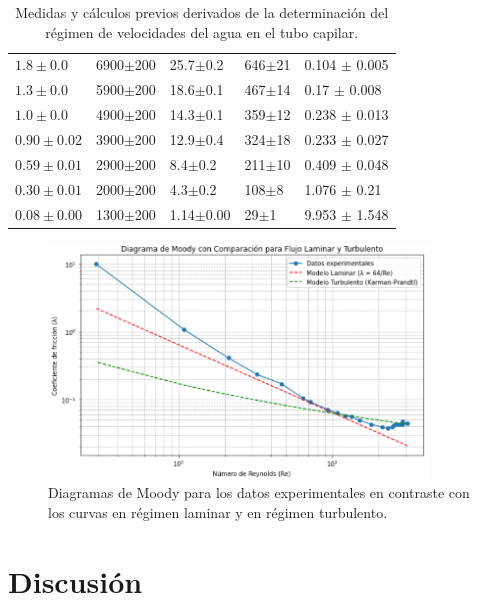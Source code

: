 \begin{table}[H]
\begin{minipage}{\textwidth}
\begin{tabular}{|C{1.8cm}|C{2cm}|C{2.5cm}|w{c}{2.5cm}|C{2.5cm}|}
				$1.8 \pm 0.0$  &  6900$\pm$200 &   25.7$\pm$0.2 &  646$\pm$21 &0.104 $\pm$ 0.005 \\
				$1.3 \pm 0.0$  &  5900$\pm$200 &   18.6$\pm$0.1 &  467$\pm$14 &0.17 $\pm$ 0.008 \\
				$1.0 \pm 0.0$  &  4900$\pm$200 &   14.3$\pm$0.1 &  359$\pm$12 &0.238 $\pm$ 0.013 \\
				$0.90\pm 0.02$ &  3900$\pm$200 &   12.9$\pm$0.4 &  324$\pm$18 &0.233 $\pm$ 0.027 \\
				$0.59\pm 0.01$ &  2900$\pm$200 &    8.4$\pm$0.2 &  211$\pm$10 &0.409 $\pm$ 0.048 \\
				$0.30\pm 0.01$ &  2000$\pm$200 &    4.3$\pm$0.2 &  108$\pm$8  &1.076 $\pm$ 0.21 \\
				$0.08\pm 0.00$ &  1300$\pm$200 &   1.14$\pm$0.00&   29$\pm$1  &9.953 $\pm$ 1.548 \\
				\bottomrule
				\bottomrule		
			\end{tabular}
			\caption{ \footnotesize Medidas y cálculos previos derivados de la determinación del régimen de velocidades del agua en el tubo capilar.}
			\label{tab:medidas_2}
		\end{minipage}
	\end{table}

	\begin{figure}[H]
		\centering
		\begin{minipage}{0.75\textwidth} 
			\includegraphics[width=0.9\textwidth]{grafico_01x04_diagrama_moody.png}
		\end{minipage}
		\caption{ \footnotesize Diagramas de Moody para los datos experimentales en contraste con los curvas en régimen laminar y en régimen turbulento.}
		\label{fig:moody}
	\end{figure}

	\section{Discusión}
	
